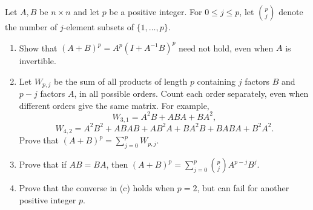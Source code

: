 \begin{problem}\label{ex:02:noncommuting-binomial}
Let $A,B$ be $n\times n$ and let $p$ be a positive integer.
For $0\leqslant j\leqslant p$, let $\binom pj$ denote the number of
$j$-element subsets of $\{1,\ldots,p\}$.
\begin{enumerate}
\item Show that $(A+B)^p=A^p(I+A^{-1}B)^p$ need not hold, even when $A$ is invertible.
\item Let $W_{p,j}$ be the sum of all products of length $p$ containing $j$
factors $B$ and $p-j$ factors $A$, in all possible orders.
Count each order separately, even when different orders give the same matrix.
For example,
\[
W_{3,1}=A^2B+ABA+BA^2,
\]
\[
W_{4,2}=A^2B^2+ABAB+AB^2A+BA^2B+BABA+B^2A^2.
\]
Prove that $(A+B)^p=\sum_{j=0}^p W_{p,j}$.
\item Prove that if $AB=BA$, then
$(A+B)^p=\sum_{j=0}^p\binom pj A^{p-j}B^j$.
\item Prove that the converse in (c) holds when $p=2$, but can fail for another positive integer $p$.
\end{enumerate}
\end{problem}
